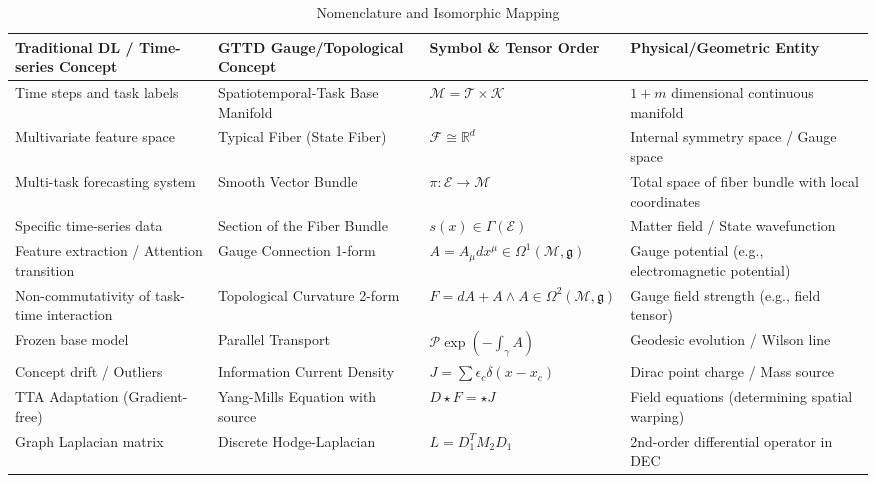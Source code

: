 \documentclass{article}
\begin{document}
\begin{table}[t]
\centering
\caption{Nomenclature and Isomorphic Mapping}
\label{tab:nomenclature}
\small
\begin{tabularx}{\textwidth}{
	>{\raggedright\arraybackslash}p{3.5cm} 
	>{\raggedright\arraybackslash}X 
	>{\raggedright\arraybackslash}p{4cm} 
	>{\raggedright\arraybackslash}X
}
\toprule
\textbf{Traditional DL / Time-series Concept} & \textbf{GTTD Gauge/Topological Concept} & \textbf{Symbol \& Tensor Order} & \textbf{Physical/Geometric Entity} \\ \midrule
Time steps and task labels & Spatiotemporal-Task Base Manifold & $\mathcal{M} = \mathcal{T} \times \mathcal{K}$ & $1+m$ dimensional continuous manifold \\ \midrule
Multivariate feature space & Typical Fiber (State Fiber) & $\mathcal{F} \cong \mathbb{R}^d$ & Internal symmetry space / Gauge space \\ \midrule
Multi-task forecasting system & Smooth Vector Bundle & $\pi: \mathcal{E} \to \mathcal{M}$ & Total space of fiber bundle with local coordinates \\ \midrule
Specific time-series data & Section of the Fiber Bundle & $s(x) \in \Gamma(\mathcal{E})$ & Matter field / State wavefunction \\ \midrule
Feature extraction / Attention transition & Gauge Connection 1-form & $A = A_\mu dx^\mu \in \Omega^1(\mathcal{M}, \mathfrak{g})$ & Gauge potential (e.g., electromagnetic potential) \\ \midrule
Non-commutativity of task-time interaction & Topological Curvature 2-form & $F = dA + A \wedge A \in \Omega^2(\mathcal{M}, \mathfrak{g})$ & Gauge field strength (e.g., field tensor) \\ \midrule
Frozen base model & Parallel Transport & $\mathcal{P}\exp(-\int_\gamma A)$ & Geodesic evolution / Wilson line \\ \midrule
Concept drift / Outliers & Information Current Density & $J = \sum \epsilon_c \delta(x-x_c)$ & Dirac point charge / Mass source \\ \midrule
TTA Adaptation (Gradient-free) & Yang-Mills Equation with source & $D \star F = \star J$ & Field equations (determining spatial warping) \\ \midrule
Graph Laplacian matrix & Discrete Hodge-Laplacian & $L = D_1^T M_2 D_1$ & 2nd-order differential operator in DEC \\ \bottomrule
\end{tabularx}
\end{table}
\end{document}

